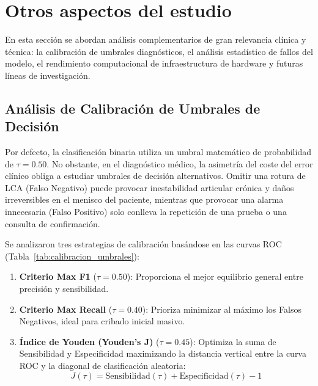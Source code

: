\section{Otros aspectos del estudio}
\label{sec:otros_aspectos}

En esta sección se abordan análisis complementarios de gran relevancia clínica y técnica: la calibración de umbrales diagnósticos, el análisis estadístico de fallos del modelo, el rendimiento computacional de infraestructura de hardware y futuras líneas de investigación.

\subsection{Análisis de Calibración de Umbrales de Decisión}
Por defecto, la clasificación binaria utiliza un umbral matemático de probabilidad de $\tau = 0.50$. No obstante, en el diagnóstico médico, la asimetría del coste del error clínico obliga a estudiar umbrales de decisión alternativos. Omitir una rotura de LCA (Falso Negativo) puede provocar inestabilidad articular crónica y daños irreversibles en el menisco del paciente, mientras que provocar una alarma innecesaria (Falso Positivo) solo conlleva la repetición de una prueba o una consulta de confirmación.

Se analizaron tres estrategias de calibración basándose en las curvas ROC (Tabla~\ref{tab:calibracion_umbrales}):
\begin{enumerate}
    \item \textbf{Criterio Max F1} ($\tau = 0.50$): Proporciona el mejor equilibrio general entre precisión y sensibilidad.
    \item \textbf{Criterio Max Recall} ($\tau = 0.40$): Prioriza minimizar al máximo los Falsos Negativos, ideal para cribado inicial masivo.
    \item \textbf{Índice de Youden (Youden's J)} ($\tau = 0.45$): Optimiza la suma de Sensibilidad y Especificidad maximizando la distancia vertical entre la curva ROC y la diagonal de clasificación aleatoria:
    \begin{equation}
        J(\tau) = \text{Sensibilidad}(\tau) + \text{Especificidad}(\tau) - 1
    \end{equation}
\end{enumerate}

